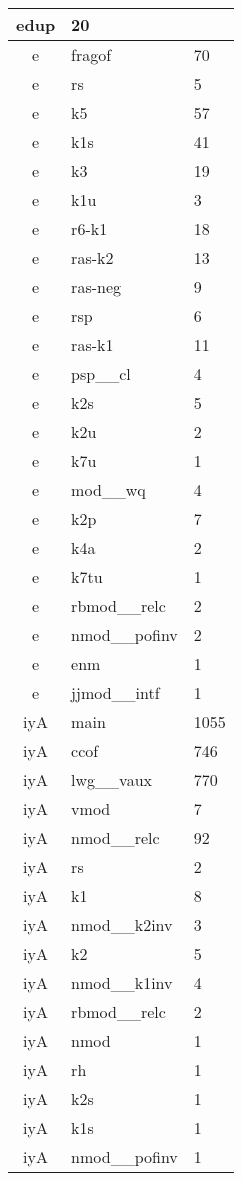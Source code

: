 \documentclass[a4 paper]{article}
\begin{document}
\begin{longtable}{cp{}p{}}
edup & 20\\ \midrule e & fragof & 70\\ \midrule e & rs & 5\\ \midrule e & k5 & 57\\ \midrule e & k1s & 41\\ \midrule e & k3 & 19\\ \midrule e & k1u & 3\\ \midrule e & r6-k1 & 18\\ \midrule e & ras-k2 & 13\\ \midrule e & ras-neg & 9\\ \midrule e & rsp & 6\\ \midrule e & ras-k1 & 11\\ \midrule e & psp\_\_cl & 4\\ \midrule e & k2s & 5\\ \midrule e & k2u & 2\\ \midrule e & k7u & 1\\ \midrule e & mod\_\_wq & 4\\ \midrule e & k2p & 7\\ \midrule e & k4a & 2\\ \midrule e & k7tu & 1\\ \midrule e & rbmod\_\_relc & 2\\ \midrule e & nmod\_\_pofinv & 2\\ \midrule e & enm & 1\\ \midrule e & jjmod\_\_intf & 1\\ \midrule 
iyA & main & 1055\\ \midrule iyA & ccof & 746\\ \midrule iyA & lwg\_\_vaux & 770\\ \midrule iyA & vmod & 7\\ \midrule iyA & nmod\_\_relc & 92\\ \midrule iyA & rs & 2\\ \midrule iyA & k1 & 8\\ \midrule iyA & nmod\_\_k2inv & 3\\ \midrule iyA & k2 & 5\\ \midrule iyA & nmod\_\_k1inv & 4\\ \midrule iyA & rbmod\_\_relc & 2\\ \midrule iyA & nmod & 1\\ \midrule iyA & rh & 1\\ \midrule iyA & k2s & 1\\ \midrule iyA & k1s & 1\\ \midrule iyA & nmod\_\_pofinv & 1\\ \midrule 

\end{longtable}
\end{document}
